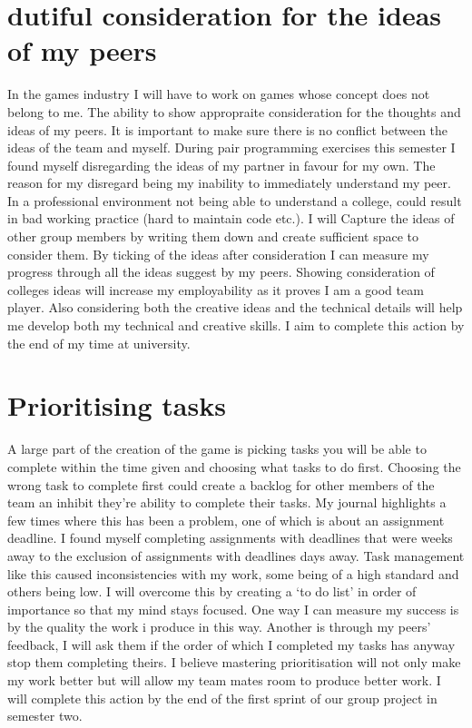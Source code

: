 \documentclass{scrartcl}
\begin{document}
\section{dutiful consideration for the ideas of my peers}
In the games industry I will have to work on games whose  concept does not belong to me. The ability to show appropraite consideration for the thoughts and ideas of my peers. It is important to make sure there is no conflict between the ideas of the team and myself. During pair programming exercises this semester I found myself disregarding the ideas of my partner in favour for my own. The reason for my disregard being my inability to immediately understand my peer. In a professional environment not being able to understand a college, could result in bad working practice (hard to maintain code etc.). I will Capture the ideas of other group members by writing them down and create sufficient space to consider them. By ticking of the ideas after consideration I can measure my progress through all the ideas suggest by my peers. Showing consideration of colleges ideas will increase my employability as it proves I am a good team player. Also considering both the creative ideas and the technical details will help me develop both my technical and creative skills. I aim to complete this action by the end of my time at university. 

\section{Prioritising tasks}
A large part of the creation of the game is picking tasks you will be able to complete within the time given and choosing what tasks to do first. Choosing the wrong task to complete first could create a backlog for other members of the team an inhibit they're ability to complete their tasks. My journal highlights a few times where this has been a problem, one of which is about an assignment deadline. I found myself completing assignments with deadlines that were weeks away to the exclusion of assignments with deadlines days away. Task management like this caused inconsistencies with my work, some being of a high standard and others being low. I will overcome this by creating a `to do list' in order of importance so that my mind stays focused. One way I can measure my success is by the quality the work i produce in this way. Another is through my peers' feedback, I will ask them if the order of which I completed my tasks has anyway stop them completing theirs. I believe mastering prioritisation will not only make my work better but will allow my team mates room to produce better work. I will complete this action by the end of the first sprint of our group project in semester two.
\end{document}
